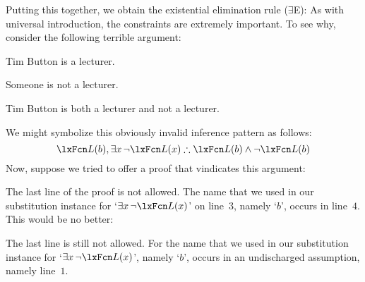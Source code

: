 Putting this together, we obtain the existential elimination rule ($\exists$E):
As with universal introduction, the constraints are extremely important. To see why, consider the following terrible argument:
	\begin{earg}
		\item Tim Button is a lecturer. 
		\item Someone is not a lecturer. 
		\item[\texttherefore] Tim Button is both a lecturer and not a lecturer.
	\end{earg}
We might symbolize this obviously invalid inference pattern as follows:
$$\atom{L}{b}, \exists x\, \enot\atom{L}{x} \therefore \atom{L}{b} \eand \enot \atom{L}{b}$$
Now, suppose we tried to offer a proof that vindicates this argument:
\begin{fitchproof}
	\PR
	\PR
	\open
		\AS
	\close
\ifHTMLtarget
\else
\fi
\end{fitchproof}
The last line of the proof is not allowed. The name that we used in our substitution instance for `$\exists x\, \enot \atom{L}{x}$' on line~$3$, namely `$b$', occurs in line~$4$. This would be no better:
\begin{fitchproof}
	\PR
	\PR
	\open
		\AS
	\close
\ifHTMLtarget
\else
\fi
\end{fitchproof}
The last line is still not allowed. For the name that we used in our substitution instance for `$\exists x\, \enot \atom{L}{x}$', namely `$b$', occurs in an undischarged assumption, namely line~$1$.

